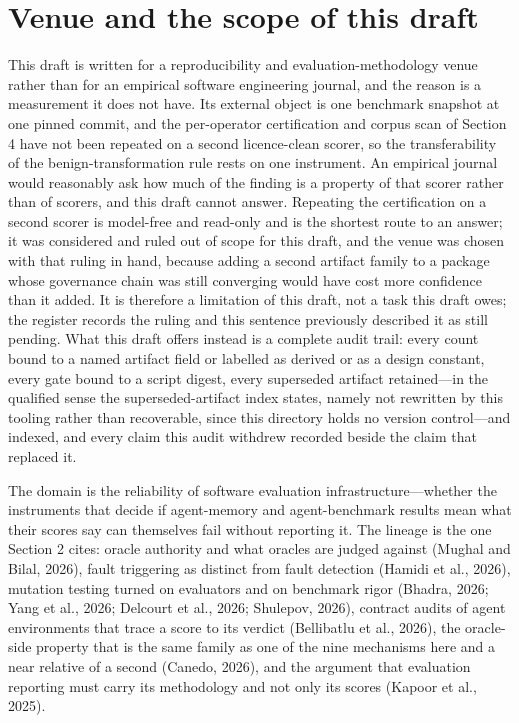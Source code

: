\documentclass[11pt]{article}
\begin{document}
\section*{Venue and the scope of this draft}
This draft is written for a reproducibility and evaluation-methodology venue rather than for an empirical software engineering journal, and the reason is a measurement it does not have. Its external object is one benchmark snapshot at one pinned commit, and the per-operator certification and corpus scan of Section 4 have not been repeated on a second licence-clean scorer, so the transferability of the benign-transformation rule rests on one instrument. An empirical journal would reasonably ask how much of the finding is a property of that scorer rather than of scorers, and this draft cannot answer. Repeating the certification on a second scorer is model-free and read-only and is the shortest route to an answer; it was considered and ruled out of scope for this draft, and the venue was chosen with that ruling in hand, because adding a second artifact family to a package whose governance chain was still converging would have cost more confidence than it added. It is therefore a limitation of this draft, not a task this draft owes; the register records the ruling and this sentence previously described it as still pending. What this draft offers instead is a complete audit trail: every count bound to a named artifact field or labelled as derived or as a design constant, every gate bound to a script digest, every superseded artifact retained---in the qualified sense the superseded-artifact index states, namely not rewritten by this tooling rather than recoverable, since this directory holds no version control---and indexed, and every claim this audit withdrew recorded beside the claim that replaced it.

The domain is the reliability of software evaluation infrastructure---whether the instruments that decide if agent-memory and agent-benchmark results mean what their scores say can themselves fail without reporting it. The lineage is the one Section 2 cites: oracle authority and what oracles are judged against (Mughal and Bilal, 2026), fault triggering as distinct from fault detection (Hamidi et al., 2026), mutation testing turned on evaluators and on benchmark rigor (Bhadra, 2026; Yang et al., 2026; Delcourt et al., 2026; Shulepov, 2026), contract audits of agent environments that trace a score to its verdict (Bellibatlu et al., 2026), the oracle-side property that is the same family as one of the nine mechanisms here and a near relative of a second (Canedo, 2026), and the argument that evaluation reporting must carry its methodology and not only its scores (Kapoor et al., 2025).
\end{document}
